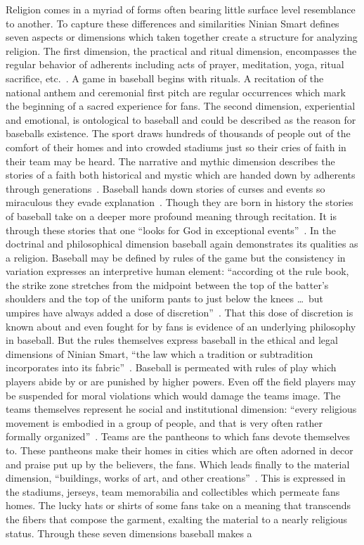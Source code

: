 \documentclass[a4paper, 12pt]{article}
\begin{document}
Religion comes in a myriad of forms often bearing little surface level resemblance to another. To capture these differences and similarities Ninian Smart defines seven aspects or dimensions which taken together create a structure for analyzing religion. The first dimension, the practical and ritual dimension, encompasses the regular behavior of adherents including acts of prayer, meditation, yoga, ritual sacrifice, etc.~\autocite{vaughn_anthology_2024}. A game in baseball begins with rituals. A recitation of the national anthem and ceremonial first pitch are regular occurrences which mark the beginning of a sacred experience for fans. The second dimension, experiential and emotional, is ontological to baseball and could be described as the reason for baseballs existence. The sport draws hundreds of thousands of people out of the comfort of their homes and into crowded stadiums just so their cries of faith in their team may be heard. The narrative and mythic dimension describes the stories of a faith both historical and mystic which are handed down by adherents through generations~\autocite{vaughn_anthology_2024}. Baseball hands down stories of curses and events so miraculous they evade explanation~\autocite{sexton_baseball_2013}. Though they are born in history the stories of baseball take on a deeper more profound meaning through recitation. It is through these stories that one ``looks for God in exceptional events''~\autocite{sexton_baseball_2013}. In the doctrinal and philosophical dimension baseball again demonstrates its qualities as a religion. Baseball may be defined by rules of the game but the consistency in variation expresses an interpretive human element: ``according ot the rule book, the strike zone stretches from the midpoint between the top of the batter's shoulders and the top of the uniform pants to just below the knees \dots\ but umpires have always added a dose of discretion''~\autocite{sexton_baseball_2013}. That this dose of discretion is known about and even fought for by fans is evidence of an underlying philosophy in baseball. But the rules themselves express baseball in the ethical and legal dimensions of Ninian Smart, ``the law which a tradition or subtradition incorporates into its fabric''~\autocite{vaughn_anthology_2024}. Baseball is permeated with rules of play which players abide by or are punished by higher powers. Even off the field players may be suspended for moral violations which would damage the teams image. The teams themselves represent he social and institutional dimension: ``every religious movement is embodied in a group of people, and that is very often rather formally organized''~\autocite{vaughn_anthology_2024}. Teams are the pantheons to which fans devote themselves to. These pantheons make their homes in cities which are often adorned in decor and praise put up by the believers, the fans. Which leads finally to the material dimension, ``buildings, works of art, and other creations''~\autocite{vaughn_anthology_2024}. This is expressed in the stadiums, jerseys, team memorabilia and collectibles which permeate fans homes. The lucky hats or shirts of some fans take on a meaning that transcends the fibers that compose the garment, exalting the material to a nearly religious status. Through these seven dimensions baseball makes a 
\end{document}

